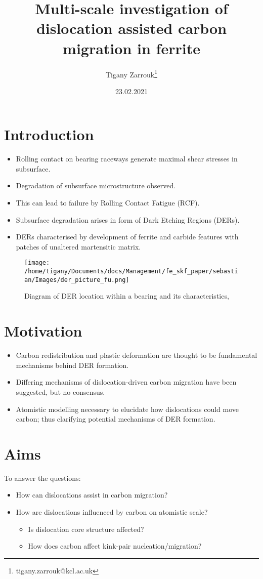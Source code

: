 \documentclass[11pt]{article}
\author{Tigany Zarrouk\thanks{tigany.zarrouk@kcl.ac.uk}}
\date{23.02.2021}
\title{Multi-scale investigation of dislocation assisted carbon migration in ferrite}
\begin{document}
\maketitle

\section*{Introduction}
\label{sec:orgcb97641}
\begin{itemize}
\item Rolling contact on bearing raceways generate maximal shear
stresses in subsurface.
\item Degradation of subsurface microstructure observed.
\item This can lead to failure by Rolling Contact Fatigue (RCF).
\item Subsurface degradation arises in form of Dark
Etching Regions (DERs).
\item DERs characterised by development of ferrite and carbide features with
patches of unaltered martensitic matrix.
\end{itemize}
\begin{figure}[htbp]
\centering
\texttt{[image: /home/tigany/Documents/docs/Management/fe\_skf\_paper/sebastian/Images/der\_picture\_fu.png]}
\caption{\label{fig:org2f48977}Diagram of DER location within a bearing and its characteristics, \cite{Fu2017} \label{fuderpicture}}
\end{figure}


\section*{Motivation}
\label{sec:orgb94488b}
\begin{itemize}
\item Carbon redistribution and plastic deformation are thought to be
fundamental mechanisms behind DER formation.
\item Differing mechanisms of dislocation-driven carbon migration have
been suggested, but no consensus.
\item Atomistic modelling necessary to elucidate how dislocations could
move carbon; thus clarifying potential mechanisms of DER formation.
\end{itemize}

\section*{Aims}
\label{sec:orgfb3a83d}
To answer the questions:
\begin{itemize}
\item How can dislocations assist in carbon migration?
\item How are dislocations influenced by carbon on atomistic scale?
\begin{itemize}
\item Is dislocation core structure affected?
\item How does carbon affect kink-pair nucleation/migration?
\end{itemize}
\end{itemize}
\end{document}
